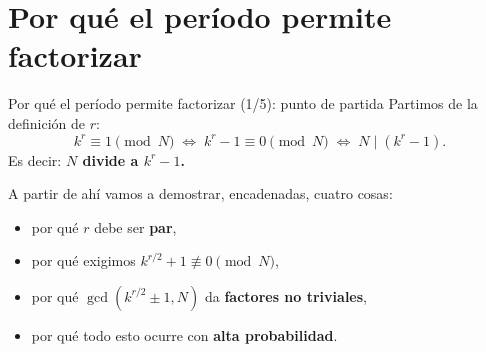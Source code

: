 \documentclass[aspectratio=169]{beamer}
\begin{document}
\section{Por qué el período permite factorizar}

\begin{frame}{Por qué el período permite factorizar (1/5): punto de partida}
  Partimos de la definición de $r$:
  \[
    k^r \equiv 1 \pmod{N}
    \;\Longleftrightarrow\;
    k^r - 1 \equiv 0 \pmod{N}
    \;\Longleftrightarrow\;
    N \mid (k^r - 1).
  \]
  Es decir: \textbf{$N$ divide a $k^r-1$.}

  \vspace{0.5em}
  A partir de ahí vamos a demostrar, encadenadas, cuatro cosas:
  \begin{itemize}
    \item[(a)] por qué $r$ debe ser \textbf{par},
    \item[(b)] por qué exigimos $k^{r/2}+1\not\equiv 0\pmod{N}$,
    \item[(c)] por qué $\gcd(k^{r/2}\pm1,N)$ da \textbf{factores no triviales},
    \item[(d)] por qué todo esto ocurre con \textbf{alta probabilidad}.
  \end{itemize}

\end{frame}
\end{document}
